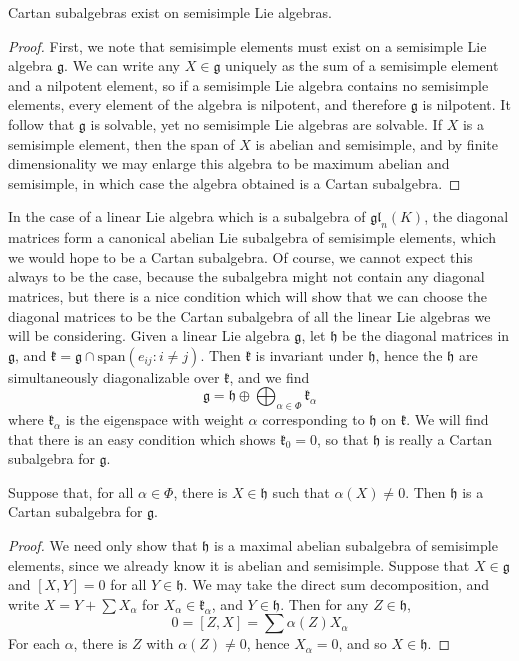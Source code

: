\begin{theorem}
    Cartan subalgebras exist on semisimple Lie algebras.
\end{theorem}
\begin{proof}
    First, we note that semisimple elements must exist on a semisimple Lie algebra $\mathfrak{g}$. We can write any $X \in \mathfrak{g}$ uniquely as the sum of a semisimple element and a nilpotent element, so if a semisimple Lie algebra contains no semisimple elements, every element of the algebra is nilpotent, and therefore $\mathfrak{g}$ is nilpotent. It follow that $\mathfrak{g}$ is solvable, yet no semisimple Lie algebras are solvable. If $X$ is a semisimple element, then the span of $X$ is abelian and semisimple, and by finite dimensionality we may enlarge this algebra to be maximum abelian and semisimple, in which case the algebra obtained is a Cartan subalgebra.
\end{proof}

In the case of a linear Lie algebra which is a subalgebra of $\mathfrak{gl}_n(K)$, the diagonal matrices form a canonical abelian Lie subalgebra of semisimple elements, which we would hope to be a Cartan subalgebra. Of course, we cannot expect this always to be the case, because the subalgebra might not contain any diagonal matrices, but there is a nice condition which will show that we can choose the diagonal matrices to be the Cartan subalgebra of all the linear Lie algebras we will be considering. Given a linear Lie algebra $\mathfrak{g}$, let $\mathfrak{h}$ be the diagonal matrices in $\mathfrak{g}$, and $\mathfrak{k} = \mathfrak{g} \cap \text{span}(e_{ij}: i \neq j)$. Then $\mathfrak{k}$ is invariant under $\mathfrak{h}$, hence the $\mathfrak{h}$ are simultaneously diagonalizable over $\mathfrak{k}$, and we find
%
\[ \mathfrak{g} = \mathfrak{h} \oplus \bigoplus_{\alpha \in \Phi} \mathfrak{k}_\alpha \]
%
where $\mathfrak{k}_\alpha$ is the eigenspace with weight $\alpha$ corresponding to $\mathfrak{h}$ on $\mathfrak{k}$. We will find that there is an easy condition which shows $\mathfrak{k}_0 = 0$, so that $\mathfrak{h}$ is really a Cartan subalgebra for $\mathfrak{g}$.

\begin{lemma}
    Suppose that, for all $\alpha \in \Phi$, there is $X \in \mathfrak{h}$ such that $\alpha(X) \neq 0$. Then $\mathfrak{h}$ is a Cartan subalgebra for $\mathfrak{g}$.
\end{lemma}
\begin{proof}
    We need only show that $\mathfrak{h}$ is a maximal abelian subalgebra of semisimple elements, since we already know it is abelian and semisimple. Suppose that $X \in \mathfrak{g}$ and $[X,Y] = 0$ for all $Y \in \mathfrak{h}$. We may take the direct sum decomposition, and write $X = Y + \sum X_\alpha$ for $X_\alpha \in \mathfrak{k}_\alpha$, and $Y \in \mathfrak{h}$. Then for any $Z \in \mathfrak{h}$,
    \[ 0 = [Z,X] = \sum \alpha(Z) X_\alpha \]
    For each $\alpha$, there is $Z$ with $\alpha(Z) \neq 0$, hence $X_\alpha = 0$, and so $X \in \mathfrak{h}$.
\end{proof}

